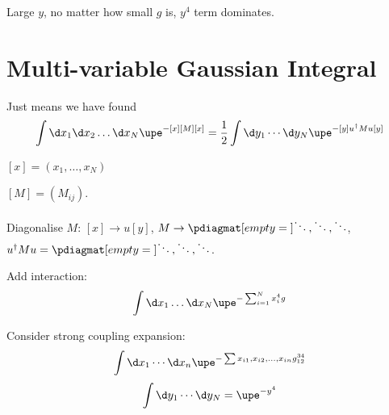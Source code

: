 Large $y$, no matter how small $g$ is, $y^4$ term dominates.

\section{Multi-variable Gaussian Integral}

Just means we have found
\begin{equation}
  \int \d x_1 \d x_2 \ldots\d x_N \upe^{-[x][M][x]} =
  \frac12\int \d y_1 \cdots\d y_N \upe^{-[y]u^\dagger Mu[y]}
\end{equation}
\begin{enumext}[columns = 2]
  \item $[x] = (x_1,\ldots,x_N)$
  \item $[M] = (M_{ij})$.
\end{enumext}

Diagonalise $M$: $[x] \to u[y]$, $M \to \pdiagmat[empty = {}]{\ddots, \ddots, \ddots}$,
$u^\dagger Mu = \pdiagmat[empty = {}]{\ddots,\ddots,\ddots}$.

\begin{framed}
  Add interaction:
  \begin{equation}
    \int \d x_1 \ldots \d x_N \upe^{-\sum_{i = 1}^N x_i^4 g}
  \end{equation}
\end{framed}

Consider strong coupling expansion:
\begin{equation}
  \int \d x_1 \cdots \d x_n \upe^{-\sum x_{i1}, x_{i2}, \ldots, x_{in} g_{12}^{34}}
\end{equation}
\begin{equation}
  \int \d y_1 \cdots \d y_N = \upe^{-y^4}
\end{equation}